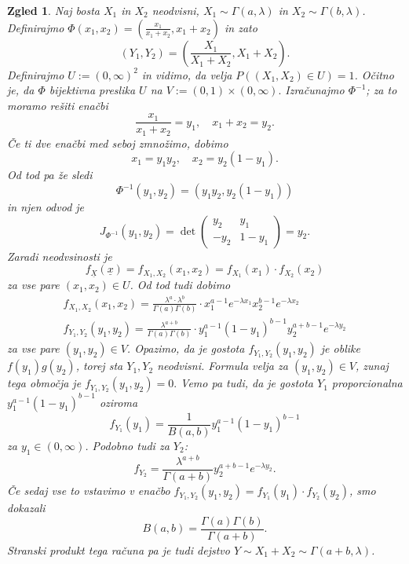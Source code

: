 \documentclass[10pt, a4paper]{article}
\newtheorem{zgled}[izr]{Zgled}
\begin{document}
\begin{zgled}
  Naj bosta $X_1$ in $X_2$ neodvisni, $X_1 \sim \Gamma(a, \lambda)$ in $X_2 \sim \Gamma(b, \lambda)$.
  Definirajmo 
  $\Phi(x_1, x_2) = \left(\frac{x_1}{x_1 + x_2}, x_1 + x_2\right)$ in zato 
  $$(Y_1, Y_2) = \left(\frac{X_1}{X_1 + X_2}, X_1 + X_2\right).$$
  Definirajmo $U := (0, \infty)^2$ in vidimo, da velja $P((X_1, X_2) \in U) = 1$.
  Očitno je, da $\Phi$ bijektivna preslika $U$ na $V:= (0, 1) \times (0, \infty).$
  Izračunajmo $\Phi^{-1}$; za to moramo rešiti enačbi 
  $$\frac{x_1}{x_1 + x_2} = y_1,\quad x_1 + x_2 = y_2.$$
  Če ti dve enačbi med seboj zmnožimo, dobimo 
  $$x_1 = y_1 y_2,\quad x_2 = y_2 (1 - y_1).$$
  Od tod pa že sledi 
  $$\Phi^{-1} (y_1, y_2) = (y_1 y_2, y_2 (1 - y_1))$$
  in njen odvod je 
  $$J_{\Phi^{-1}} (y_1, y_2) = \det \begin{pmatrix}
    y_2 & y_1\\
    -y_2 & 1 - y_1
  \end{pmatrix} = y_2.$$  
  Zaradi neodvsinosti je 
  $$f_{\underline{X}} (\underline{x}) = f_{X_1, X_2} (x_1, x_2) = f_{X_1} (x_1) \cdot f_{X_2} (x_2)$$
  za vse pare $(x_1, x_2) \in U$. Od tod tudi dobimo 
  \begin{gather*}
    f_{X_1, X_2} (x_1, x_2) = \frac{\lambda^a \cdot \lambda^b}{\Gamma(a) \Gamma(b)} \cdot x_1^{a-1} e^{-\lambda x_1} x_2^{b - 1} e^{-\lambda x_2}\\
    f_{Y_1, Y_2} (y_1, y_2) = \frac{\lambda^{a + b}}{\Gamma(a) \Gamma(b)} \cdot y_1^{a - 1} (1 - y_1)^{b - 1} y_2^{a + b - 1} e^{-\lambda y_2} 
  \end{gather*}
  za vse pare $(y_1, y_2) \in V$. Opazimo, da je gostota $f_{Y_1, Y_2} (y_1, y_2)$ je oblike $f(y_1) g(y_2)$,
  torej sta $Y_1, Y_2$ neodvisni. Formula velja za $(y_1, y_2) \in V$, zunaj tega območja je $f_{Y_1, Y_2} (y_1, y_2) = 0.$
  Vemo pa tudi, da je gostota $Y_1$ proporcionalna $y_1^{a - 1} (1 - y_1)^{b - 1}$ oziroma 
  $$f_{Y_1} (y_1) = \frac{1}{B(a, b)} y_1^{a - 1} (1 - y_1)^{b - 1}$$
  za $y_1 \in (0, \infty)$. Podobno tudi za $Y_2$:
  $$f_{Y_2} = \frac{\lambda^{a +b}}{\Gamma(a+ b)}  y_2^{a + b - 1} e^{-\lambda y_2}.$$
  Če sedaj vse to vstavimo v enačbo $f_{Y_1, Y_2} (y_1, y_2) = f_{Y_1} (y_1) \cdot f_{Y_2} (y_2)$,
  smo dokazali $$B(a, b) = \frac{\Gamma(a) \Gamma(b)}{\Gamma(a + b)}.$$
  Stranski produkt tega računa pa je tudi dejstvo $Y \sim X_1 + X_2 \sim \Gamma(a + b, \lambda)$.
\end{zgled}
\end{document}

